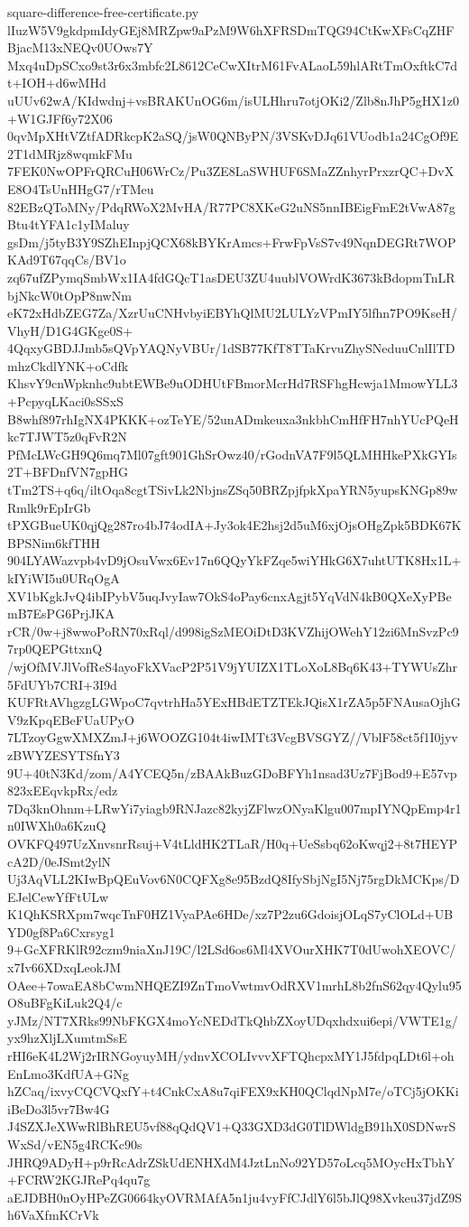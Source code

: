 \documentclass[11pt]{article}
\theoremstyle{definition}
\theoremstyle{remark}
\begin{document}
\begin{filecontents*}[overwrite]{square-difference-free-certificate.py}
lIuzW5V9gkdpmIdyGEj8MRZpw9aPzM9W6hXFRSDmTQG94CtKwXFsCqZHFBjacM13xNEQv0UOws7Y
Mxq4uDpSCxo9st3r6x3mbfc2L8612CeCwXItrM61FvALaoL59hlARtTmOxftkC7dt+IOH+d6wMHd
uUUv62wA/KIdwdnj+vsBRAKUnOG6m/isULHhru7otjOKi2/Zlb8nJhP5gHX1z0+W1GJFf6y72X06
0qvMpXHtVZtfADRkcpK2aSQ/jsW0QNByPN/3VSKvDJq61VUodb1a24CgOf9E2T1dMRjz8wqmkFMu
7FEK0NwOPFrQRCuH06WrCz/Pu3ZE8LaSWHUF6SMaZZnhyrPrxzrQC+DvXE8O4TsUnHHgG7/rTMeu
82EBzQToMNy/PdqRWoX2MvHA/R77PC8XKeG2uNS5nnIBEigFmE2tVwA87gBtu4tYFA1c1yIMaluy
gsDm/j5tyB3Y9SZhEInpjQCX68kBYKrAmcs+FrwFpVsS7v49NqnDEGRt7WOPKAd9T67qqCs/BV1o
zq67ufZPymqSmbWx1IA4fdGQcT1asDEU3ZU4uublVOWrdK3673kBdopmTnLRbjNkcW0tOpP8nwNm
eK72xHdbZEG7Za/XzrUuCNHvbyiEBYhQlMU2LULYzVPmIY5lfhn7PO9KseH/VhyH/D1G4GKge0S+
4QqxyGBDJJmb5sQVpYAQNyVBUr/1dSB77KfT8TTaKrvuZhySNeduuCnlIlTDmhzCkdlYNK+oCdfk
KhsvY9cnWpknhc9ubtEWBe9uODHUtFBmorMcrHd7RSFhgHcwja1MmowYLL3+PcpyqLKaci0sSSxS
B8whf897rhIgNX4PKKK+ozTeYE/52unADmkeuxa3nkbhCmHfFH7nhYUcPQeHkc7TJWT5z0qFvR2N
PfMcLWcGH9Q6mq7Ml07gft901GhSrOwz40/rGodnVA7F9l5QLMHHkePXkGYIs2T+BFDnfVN7gpHG
tTm2TS+q6q/iltOqa8cgtTSivLk2NbjnsZSq50BRZpjfpkXpaYRN5yupsKNGp89wRmlk9rEpIrGb
tPXGBueUK0qjQg287ro4bJ74odIA+Jy3ok4E2hsj2d5uM6xjOjsOHgZpk5BDK67KBPSNim6kfTHH
904LYAWazvpb4vD9jOsuVwx6Ev17n6QQyYkFZqe5wiYHkG6X7uhtUTK8Hx1L+kIYiWI5u0URqOgA
XV1bKgkJvQ4ibIPybV5uqJvyIaw7OkS4oPay6cnxAgjt5YqVdN4kB0QXeXyPBemB7EsPG6PrjJKA
rCR/0w+j8wwoPoRN70xRql/d998igSzMEOiDtD3KVZhijOWehY12zi6MnSvzPc97rp0QEPGttxnQ
/wjOfMVJlVofReS4ayoFkXVacP2P51V9jYUIZX1TLoXoL8Bq6K43+TYWUsZhr5FdUYb7CRI+3I9d
KUFRtAVhgzgLGWpoC7qvtrhHa5YExHBdETZTEkJQisX1rZA5p5FNAusaOjhGV9zKpqEBeFUaUPyO
7LTzoyGgwXMXZmJ+j6WOOZG104t4iwIMTt3VcgBVSGYZ//VblF58ct5f1I0jyvzBWYZESYTSfnY3
9U+40tN3Kd/zom/A4YCEQ5n/zBAAkBuzGDoBFYh1nsad3Uz7FjBod9+E57vp823xEEqvkpRx/edz
7Dq3knOhnm+LRwYi7yiagb9RNJazc82kyjZFlwzONyaKlgu007mpIYNQpEmp4r1n0IWXh0a6KzuQ
OVKFQ497UzXnvsnrRsuj+V4tLldHK2TLaR/H0q+UeSsbq62oKwqj2+8t7HEYPcA2D/0eJSmt2ylN
Uj3AqVLL2KIwBpQEuVov6N0CQFXg8e95BzdQ8IfySbjNgI5Nj75rgDkMCKps/DEJelCewYfFtULw
K1QhKSRXpm7wqcTnF0HZ1VyaPAe6HDe/xz7P2zu6GdoisjOLqS7yClOLd+UBYD0gf8Pa6Cxrsyg1
9+GcXFRKlR92czm9niaXnJ19C/l2LSd6os6Ml4XVOurXHK7T0dUwohXEOVC/x7Iv66XDxqLeokJM
OAee+7owaEA8bCwmNHQEZI9ZnTmoVwtmvOdRXV1mrhL8b2fnS62qy4Qylu95O8uBFgKiLuk2Q4/c
yJMz/NT7XRks99NbFKGX4moYcNEDdTkQhbZXoyUDqxhdxui6epi/VWTE1g/yx9hzXljLXumtmSsE
rHI6eK4L2Wj2rIRNGoyuyMH/ydnvXCOLIvvvXFTQhcpxMY1J5fdpqLDt6l+ohEnLmo3KdfUA+GNg
hZCaq/ixvyCQCVQxfY+t4CnkCxA8u7qiFEX9xKH0QClqdNpM7e/oTCj5jOKKiiBeDo3l5vr7Bw4G
J4SZXJeXWwRlBhREU5vf88qQdQV1+Q33GXD3dG0TlDWldgB91hX0SDNwrSWxSd/vEN5g4RCKc90s
JHRQ9ADyH+p9rRcAdrZSkUdENHXdM4JztLnNo92YD57oLcq5MOycHxTbhY+FCRW2KGJRePq4qu7g
aEJDBH0nOyHPeZG0664kyOVRMAfA5n1ju4vyFfCJdlY6l5bJlQ98Xvkeu37jdZ9Sh6VaXfmKCrVk

\end{filecontents*}
\end{document}
